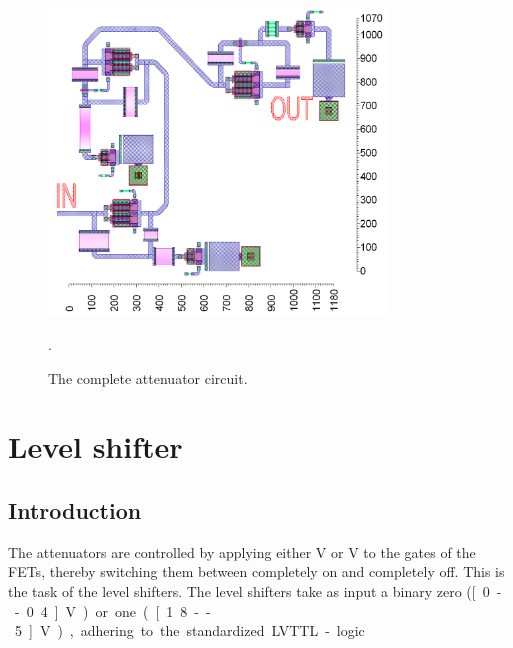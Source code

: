		\begin{figure}[h!]
			\centering
			\includegraphics[width=0.8\textwidth]{fig/attenuators/attenuators_layout}
			\caption[Attenuator circuit layout]{The complete attenuator circuit.\scalemum}\label{fig:attenuators_layout}.
		\end{figure}

	
				


		

\section{Level shifter}

	\subsection{Introduction}
		The attenuators are controlled by applying either \unit[5]{V} or \unit[3]{V} to the gates of the FETs, thereby switching them between completely on and completely off. This is the task of the level shifters. The level shifters take as input a binary zero (\unit[0--0.4]{V}) or one (\unit[1.8--5]{V}), adhering to the standardized LVTTL-logic.\autocite{lvttl11} %
		
